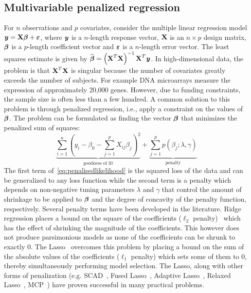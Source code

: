 \subsection{Multivariable penalized regression} \label{sec:pen}
For $n$ observations and $p$ covariates, consider the multiple linear regression model \mbox{$\textbf{\emph{y}} = \textbf{X} \boldsymbol{\beta} + \boldsymbol{\varepsilon}$}, where $\textbf{\emph{y}}$ is a $n$-length response vector, $\textbf{X}$ is an $n \times p$ design matrix, $\boldsymbol{\beta}$ is a $p$-length coefficient vector and $\boldsymbol{\varepsilon}$ is a $n$-length error vector. 
The least squares estimate is given by $ \widehat{\boldsymbol{\beta}} = \left( \textbf{X}^T \textbf{X}  \right)^{-1} \textbf{X}^T \textbf{\emph{y}} $. In high-dimensional data, the problem is that $\textbf{X}^T \textbf{X}$ is singular because the number of covariates greatly exceeds the number of subjects. 
For example DNA microarrays measure the expression of approximately 20,000 genes. 
However, due to funding constraints, the sample size is often less than a few hundred. 
A common solution to this problem is through penalized regression, i.e., apply a constraint on the values of $\boldsymbol{\beta}$. The problem can be formulated as finding the vector $\boldsymbol{\beta}$ that minimizes the penalized sum of squares:
\begin{equation}
\underbrace{\sum\limits_{i=1}^{n} \left( y_i - \beta_0 - \sum\limits_{j=1}^{p}X_{ij}\beta_j \right)^2}_{\textrm{goodness of fit}} +  \underbrace{\sum\limits_{j=1}^{p} p(\beta_j;\lambda, \gamma)}_{\textrm{penalty}} \label{eq:penalisedlikelihood}
\end{equation}
The first term of~\eqref{eq:penalisedlikelihood} is the squared loss of the data and can be generalized to any loss function while the second term is a penalty which depends on non-negative tuning parameters $\lambda$ and $\gamma$ that control the amount of shrinkage to be applied to $\boldsymbol{\beta}$ and the degree of concavity of the penalty function, respectively. 
Several penalty terms have been developed in the literature. Ridge regression places a bound on the square of the coefficients ($\ell_2$ penalty)~\citep{hoerl1970ridge} which has the effect of shrinking the magnitude of the coefficients. 
This however does not produce parsimonious models as none of the coefficients can be shrunk to exactly 0. The Lasso~\citep{tibshirani1996regression} overcomes this problem by placing a bound on the sum of the absolute values of the coefficients ($\ell_1$ penalty) which sets some of them to 0, thereby simultaneously performing model selection. The Lasso, along with other forms of penalization (e.g. SCAD~\cite{fan2001variable}, Fused Lasso~\citep{tibshirani2005sparsity}, Adaptive Lasso~\citep{zou2006adaptive}, Relaxed Lasso~\citep{meinshausen2007relaxed}, MCP~\citep{zhang2010nearly}) have proven successful in many practical problems.
